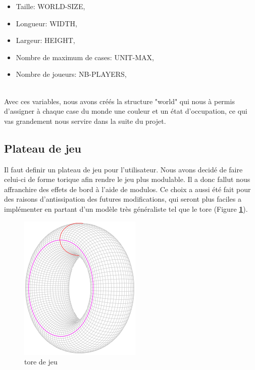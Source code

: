         \begin{itemize}
            \item Taille: WORLD-SIZE,
            \item Longueur: WIDTH,
            \item Largeur: HEIGHT,
            \item Nombre de maximum de cases: UNIT-MAX,
            \item Nombre de joueurs: NB-PLAYERS,
        \end{itemize}
        
        \noindent \\ Avec ces variables, nous avons créés la structure "world" qui nous à permis d'assigner à chaque case du monde une couleur et un état d'occupation, ce qui vas grandement nous servire dans la suite du projet.
        
    \subsection{Plateau de jeu}
        Il faut definir un plateau de jeu pour l'utilisateur. Nous avons decidé de faire celui-ci de forme torique afin rendre le jeu plus modulable. Il a donc fallut nous affranchire des effets de bord à l'aide de modulos. Ce choix a aussi été fait pour des raisons d'antissipation des futures modifications, qui seront plus faciles a implémenter en partant d'un modèle très généraliste tel que le tore (Figure \textbf{\ref{fig:tore_de_jeu}}).\\
        \newline
            \begin{figure}[H]
                \centering
                \includegraphics[scale=0.4]{tor.png}
                \caption{tore de jeu}
                \label{fig:tore_de_jeu}
            \end{figure}
  
